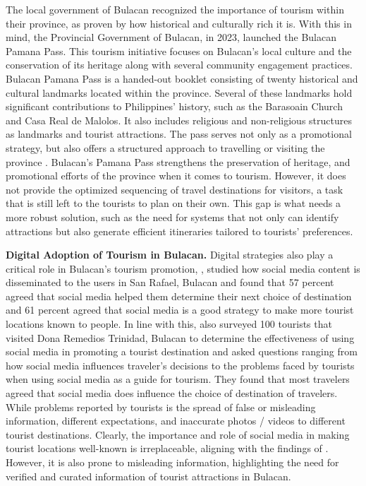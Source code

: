 The local government of Bulacan recognized the importance of tourism within their province, as proven by how historical and culturally rich it is. With this in mind, the Provincial Government of Bulacan, in 2023, launched the Bulacan Pamana Pass. This tourism initiative focuses on Bulacan’s local culture and the conservation of its heritage along with several community engagement practices. Bulacan Pamana Pass is a handed-out booklet consisting of twenty historical and cultural landmarks located within the province. Several of these landmarks hold significant contributions to Philippines’ history, such as the Barasoain Church and Casa Real de Malolos. It also includes religious and non-religious structures as landmarks and tourist attractions. The pass serves not only as a promotional strategy, but also offers a structured approach to travelling or visiting the province \parencite{Velasco2023}. Bulacan’s Pamana Pass strengthens the preservation of heritage, and promotional efforts of the province when it comes to tourism. However, it does not provide the optimized sequencing of travel destinations for visitors, a task that is still left to the tourists to plan on their own. This gap is what needs a more robust solution, such as the need for systems that not only can identify attractions but also generate efficient itineraries tailored to tourists’ preferences.

\textbf{Digital Adoption of Tourism in Bulacan.} Digital strategies also play a critical role in Bulacan’s tourism promotion, \textcite{Canet2023SanRafael}, studied how social media content is disseminated to the users in San Rafael, Bulacan and found that 57 percent agreed that social media helped them determine their next choice of destination and 61 percent agreed that social media is a good strategy to make more tourist locations known to people. In line with this, \textcite{DelaCruz2022} also surveyed 100 tourists that visited Dona Remedios Trinidad, Bulacan to determine the effectiveness of using social media in promoting a tourist destination and asked questions ranging from how social media influences traveler’s decisions to the problems faced by tourists when using social media as a guide for tourism. They found that most travelers agreed that social media does influence the choice of destination of travelers. While problems reported by tourists is the spread of false or misleading information, different expectations, and inaccurate photos / videos to different tourist destinations. Clearly, the importance and role of social media in making tourist locations well-known is irreplaceable, aligning with the findings of \textcite{Canet2025S}. However, it is also prone to misleading information, highlighting the need for verified and curated information of tourist attractions in Bulacan.

